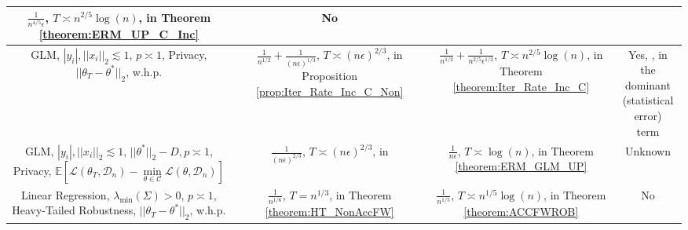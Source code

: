 \documentclass{article}
\begin{document}
\begin{table}[!htbp]
\begin{tabular}{|c|c|c|c|}
        \makecell{\\$\frac{1}{n^{4/5}\epsilon}$, \\ \\ $T \asymp n^{2/5}\log(n)$, \\ in Theorem \ref{theorem:ERM_UP_C_Inc}} & 
        No\\
        \hline
        \makecell{GLM, $|y_i|, ||x_i||_2 \lesssim 1$, $p \asymp 1$, \\ Privacy, $||\theta_T - \theta^*||_2$, w.h.p.} & \makecell{\\$\frac{1}{n^{1/2}} + \frac{1}{(n\epsilon)^{1/3}}$, \\ \\ $T \asymp (n\epsilon)^{2/3}$, \\ in Proposition \ref{prop:Iter_Rate_Inc_C_Non}} & 
        \makecell{\\$\frac{1}{n^{1/2}} + \frac{1}{n^{2/5}\epsilon^{1/2}}$, \\ \\ $T \asymp n^{2/5}\log(n)$, \\ in Theorem \ref{theorem:Iter_Rate_Inc_C}} & 
        \makecell{Yes, \cite{Cai_Cost_GLM}, in \\ the dominant \\ (statistical error) \\ term}\\
        \hline
        \makecell{GLM, $|y_i|, ||x_i||_2 \lesssim 1$, \\ $||\theta^*||_2 - D, p \asymp 1$, Privacy, \\ $\mathbb{E}\left[\mathcal{L}(\theta_T, \mathcal{D}_n) - \mathop{\min}\limits_{\theta \in \mathcal{C}}\mathcal{L}(\theta, \mathcal{D}_n)\right]$} & 
        \makecell{\\$\frac{1}{(n\epsilon)^{2/3}}$, \\ \\ $T \asymp \left(n\epsilon\right)^{2/3}$, \\ in \cite{NOPL}} & 
        \makecell{\\$\frac{1}{n\epsilon}$, \\ \\ $T \asymp \log(n)$, \\in Theorem \ref{theorem:ERM_GLM_UP}} & 
        Unknown \\
        \hline
        \makecell{Linear Regression, $\lambda_{\min}(\Sigma) > 0$, \\ $p \asymp 1$, Heavy-Tailed Robustness, \\ $||\theta_T - \theta^*||_2$, w.h.p.} & \makecell{\\$\frac{1}{n^{1/6}}$, \\ \\ $T = n^{1/3}$, \\in Theorem \ref{theorem:HT_NonAccFW}} & \makecell{\\$\frac{1}{n^{1/5}}$, \\ \\ $T \asymp n^{1/5}\log(n)$, \\ in Theorem \ref{theorem:ACCFWROB}} & No\\

\end{tabular}
\end{table}
\end{document}

